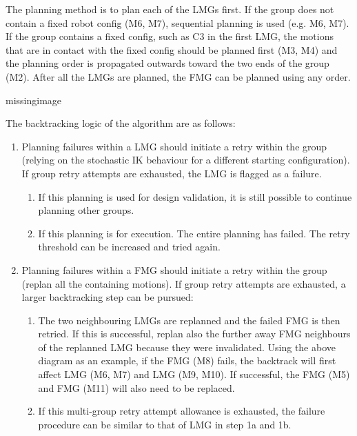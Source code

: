 The planning method is to plan each of the LMGs first. If the group does not contain a fixed robot config (M6, M7), sequential planning is used (e.g. M6, M7). If the group contains a fixed config, such as C3 in the first LMG, the motions that are in contact with the fixed config should be planned first (M3, M4) and the planning order is propagated outwards toward the two ends of the group (M2). After all the LMGs are planned, the FMG can be planned using any order. 

missingimage

The backtracking logic of the algorithm are as follows:
\begin{enumerate}
    \item Planning failures within a LMG should initiate a retry within the group (relying on the stochastic IK behaviour for a different starting configuration). If group retry attempts are exhausted, the LMG is flagged as a failure.
    \begin{enumerate}
        \item If this planning is used for design validation, it is still possible to continue planning other groups.
        \item If this planning is for execution. The entire planning has failed. The retry threshold can be increased and tried again.
    \end{enumerate}
    \item Planning failures within a FMG should initiate a retry within the group (replan all the containing motions). If group retry attempts are exhausted, a larger backtracking step can be pursued:
    \begin{enumerate}
        \item The two neighbouring LMGs are replanned and the failed FMG is then retried. If this is successful, replan also the further away FMG neighbours of the replanned LMG because they were invalidated. Using the above diagram as an example, if the FMG (M8) fails, the backtrack will first affect LMG (M6, M7) and LMG (M9, M10). If successful, the FMG (M5) and FMG (M11) will also need to be replaced.
        \item If this multi-group retry attempt allowance is exhausted, the failure procedure can be similar to that of LMG in step 1a and 1b.
    \end{enumerate}
\end{enumerate}

